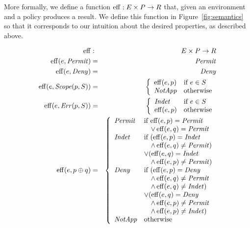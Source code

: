 More formally, we define a function $\operatorname{eff} : E \times P \rightarrow R$
that, given an environment and a policy produces a result.  We define
this function in Figure~\ref{fig:semantics} so that it corresponds to
our intuition about the desired properties, as described above.

\begin{figure}[t]
\centering
\begin{footnotesize}
\begin{eqnarray*}
  \eff & : & E \times P \rightarrow R \\
  \eff (e, \Permit) & = & \Permit \\
  \eff (e, \Deny) & = & \Deny \\
  \eff (e, \Scope (p, S)) & = & \left\{\begin{array}{ll}
  \eff (e, p) & \text{if $e \in S$} \\
  \NotApplicable & \text{otherwise}
  \end{array}\right. \\
  \eff (e, \Err (p, S)) & = & \left\{\begin{array}{ll}
  \Indeterminate & \text{if $e \in S$} \\
  \eff (e, p) & \text{otherwise}
  \end{array}\right. \\
  \eff (e, p \oplus q) & = & \left\{\begin{array}{ll}
  \Permit & \text{if $\eff(e, p) = \Permit$} \\
  & \text{$\quad \vee \eff(e, q) = \Permit$} \\
  \Indeterminate & \text{if } (\eff(e, p) = \Indeterminate \\
  & \quad \wedge \eff(e, q) \neq \Permit) \\
  &  \vee (\eff(e, q) = \Indeterminate \\
  & \quad \wedge \eff(e, p) \neq \Permit) \\
  \Deny & \text{if } (\eff(e, p) = \Deny \\
  & \quad \wedge \eff(e, q) \neq \Permit \\
  & \quad \wedge \eff(e, q) \neq \Indeterminate) \\
  & \vee (\eff(e, q) = \Deny \\
  & \quad \wedge \eff(e, p) \neq \Permit \\
  & \quad \wedge \eff(e, p) \neq \Indeterminate) \\
  \NotApplicable & \text{otherwise}
  \end{array}\right. \\

\end{eqnarray*}
\end{footnotesize}
\end{figure}
